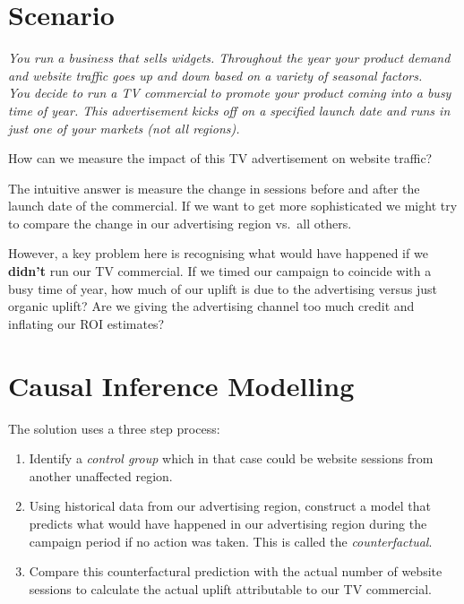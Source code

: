 \documentclass[]{book}
\providecommand{\tightlist}{%
  \setlength{\itemsep}{0pt}\setlength{\parskip}{0pt}}
\begin{document}
\section{Scenario}\label{scenario}

\emph{You run a business that sells widgets. Throughout the year your
product demand and website traffic goes up and down based on a variety
of seasonal factors.\\
You decide to run a TV commercial to promote your product coming into a
busy time of year. This advertisement kicks off on a specified launch
date and runs in just one of your markets (not all regions).}

How can we measure the impact of this TV advertisement on website
traffic?

The intuitive answer is measure the change in sessions before and after
the launch date of the commercial. If we want to get more sophisticated
we might try to compare the change in our advertising region vs.~all
others.

However, a key problem here is recognising what would have happened if
we \textbf{didn't} run our TV commercial. If we timed our campaign to
coincide with a busy time of year, how much of our uplift is due to the
advertising versus just organic uplift? Are we giving the advertising
channel too much credit and inflating our ROI estimates?

\section{Causal Inference Modelling}\label{causal-inference-modelling}

The solution uses a three step process:

\begin{enumerate}
\def\labelenumi{\arabic{enumi})}
\tightlist
\item
  Identify a \emph{control group} which in that case could be website
  sessions from another unaffected region.
\item
  Using historical data from our advertising region, construct a model
  that predicts what would have happened in our advertising region
  during the campaign period if no action was taken. This is called the
  \emph{counterfactual}.
\item
  Compare this counterfactural prediction with the actual number of
  website sessions to calculate the actual uplift attributable to our TV
  commercial.
\end{enumerate}
\end{document}
